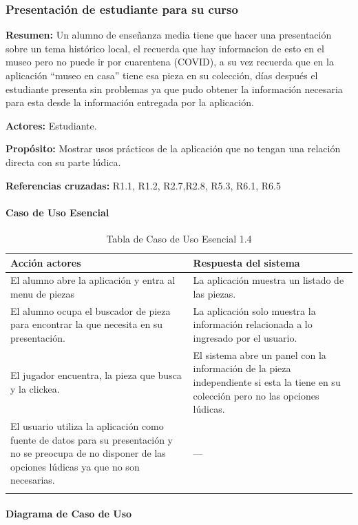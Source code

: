 \subsubsection{Presentación de estudiante para su curso}

{\textbf {Resumen:}}
Un alumno de enseñanza media tiene que hacer una presentación sobre un tema histórico local, el recuerda que hay informacion de esto en el museo pero no puede ir por cuarentena (COVID), a su vez recuerda que en la aplicación “museo en casa” tiene esa pieza en su colección, días después el estudiante presenta sin problemas ya que pudo obtener la información necesaria para esta desde la información entregada por la aplicación.

{\textbf {Actores:}}
Estudiante.

{\textbf {Propósito:}}
Mostrar usos prácticos de la aplicación que no tengan una relación directa con su parte lúdica.

{\textbf {Referencias cruzadas:}}
R1.1, R1.2, R2.7,R2.8, R5.3, R6.1, R6.5

\paragraph{Caso de Uso Esencial}

\begin{longtable}{|p{5cm}|p{8cm}|}
\hline 
Acción actores & Respuesta del sistema \\ 
\hline 
El alumno abre la aplicación y entra al menu de piezas & La aplicación muestra un listado de las piezas. \\ 
\hline
El alumno ocupa el buscador de pieza para encontrar la que necesita en su presentación. & La aplicación solo muestra la información relacionada a lo ingresado por el usuario. \\ 
\hline 
El jugador encuentra, la pieza que busca y la clickea. & El sistema abre un panel con la información de la pieza independiente si esta la tiene en su colección pero no las opciones lúdicas. \\ 
\hline 
El usuario utiliza la aplicación como fuente de datos para su presentación y no se preocupa de no disponer de las opciones lúdicas ya que no son necesarias. & --- \\ 
\hline 
\caption{Tabla de Caso de Uso Esencial 1.4}
\label{tab24}
\end{longtable}

\paragraph{Diagrama de Caso de Uso}


